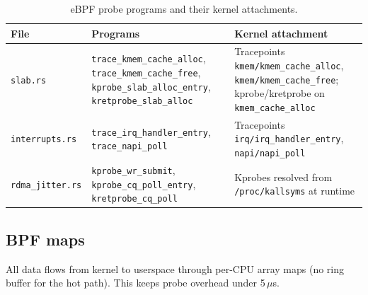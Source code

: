 \documentclass[11pt]{article}
\begin{document}
\begin{table}[h]
\centering
\small
\begin{tabularx}{\textwidth}{p{3.4cm}p{3.8cm}X}
\toprule
File & Programs & Kernel attachment \\
\midrule
\texttt{slab.rs} & \texttt{trace\_kmem\_cache\_alloc}, \texttt{trace\_kmem\_cache\_free}, \texttt{kprobe\_slab\_alloc\_entry}, \texttt{kretprobe\_slab\_alloc} & Tracepoints \texttt{kmem/kmem\_cache\_alloc}, \texttt{kmem/kmem\_cache\_free}; kprobe/kretprobe on \texttt{kmem\_cache\_alloc} \\[4pt]
\texttt{interrupts.rs} & \texttt{trace\_irq\_handler\_entry}, \texttt{trace\_napi\_poll} & Tracepoints \texttt{irq/irq\_handler\_entry}, \texttt{napi/napi\_poll} \\[4pt]
\texttt{rdma\_jitter.rs} & \texttt{kprobe\_wr\_submit}, \texttt{kprobe\_cq\_poll\_entry}, \texttt{kretprobe\_cq\_poll} & Kprobes resolved from \texttt{/proc/kallsyms} at runtime \\
\bottomrule
\end{tabularx}
\caption{eBPF probe programs and their kernel attachments.}
\end{table}

\subsection{BPF maps}

All data flows from kernel to userspace through per-CPU array maps (no ring
buffer for the hot path). This keeps probe overhead under 5\,$\mu$s.
\end{document}
